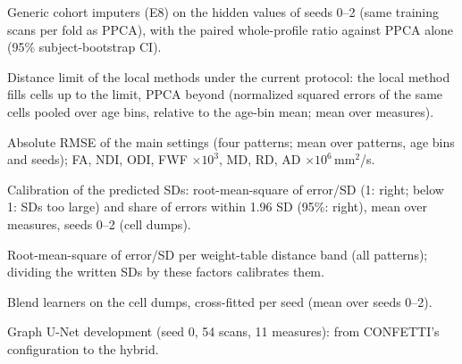 \documentclass[11pt]{article}
\begin{document}
\begin{table}[h]
\centering\footnotesize
\caption{Generic cohort imputers (E8) on the hidden values of seeds 0--2 (same training scans per fold as PPCA), with
the paired whole-profile ratio against PPCA alone (95\% subject-bootstrap CI).}\label{tab:baselines}
\resizebox{\textwidth}{!}{}
\end{table}

\begin{table}[h]
\centering\footnotesize
\caption{Distance limit of the local methods under the current protocol: the local method fills cells up to the limit,
PPCA beyond (normalized squared errors of the same cells pooled over age bins, relative to the age-bin mean; mean over
measures).}\label{tab:cap}

\end{table}

\begin{table}[h]
\centering\footnotesize
\caption{Absolute RMSE of the main settings (four patterns; mean over patterns, age bins and seeds); FA, NDI, ODI, FWF
$\times10^{3}$, MD, RD, AD $\times10^{6}$\,mm$^2$/s.}\label{tab:absall}

\end{table}

\begin{table}[h]
\centering\footnotesize
\caption{Calibration of the predicted SDs: root-mean-square of error/SD (1: right; below 1: SDs too large) and share of
errors within 1.96 SD (95\%: right), mean over measures, seeds 0--2 (cell dumps).}\label{tab:calib}

\end{table}

\begin{table}[h]
\centering\footnotesize
\caption{Root-mean-square of error/SD per weight-table distance band (all patterns); dividing the written SDs by
these factors calibrates them.}\label{tab:calibband}
\resizebox{\textwidth}{!}{}
\end{table}

\begin{table}[h]
\centering\footnotesize
\caption{Blend learners on the cell dumps, cross-fitted per seed (mean over seeds 0--2).}\label{tab:learners}
\resizebox{\textwidth}{!}{}
\end{table}

\begin{table}[h]
\centering\footnotesize
\caption{Graph U-Net development (seed 0, 54 scans, 11 measures): from CONFETTI's configuration to the hybrid.}\label{tab:confetti}

\end{table}
\end{document}
